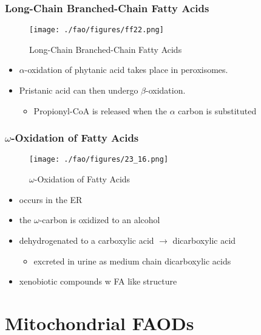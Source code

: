 \documentclass{scrartcl}
\begin{document}
\subsubsection{Long-Chain Branched-Chain Fatty Acids}
\label{sec:orga7667ab}

\begin{figure}[htbp]
\centering
\texttt{[image: ./fao/figures/ff22.png]}
\caption{\label{fig:org9d9a84f}
Long-Chain Branched-Chain Fatty Acids}
\end{figure}

\begin{itemize}
\item \(\alpha\)-oxidation of phytanic acid takes place in peroxisomes.
\item Pristanic acid can then undergo \(\beta\)-oxidation.
\begin{itemize}
\item Propionyl-CoA is released when the \(\alpha\) carbon is substituted
\end{itemize}
\end{itemize}

\subsubsection{\(\omega\)-Oxidation of Fatty Acids}
\label{sec:orge16485b}

\begin{figure}[htbp]
\centering
\texttt{[image: ./fao/figures/23\_16.png]}
\caption{\label{fig:orgba20944}
\(\omega\)-Oxidation of Fatty Acids}
\end{figure}

\begin{itemize}
\item occurs in the ER
\item the \(\omega\)-carbon is oxidized to an alcohol
\item dehydrogenated to a carboxylic acid \(\to\) dicarboxylic acid
\begin{itemize}
\item excreted in urine as medium chain dicarboxylic acids
\end{itemize}
\item xenobiotic compounds w FA like structure
\end{itemize}
\section{Mitochondrial FAODs}
\label{sec:org4c48368}
\end{document}
